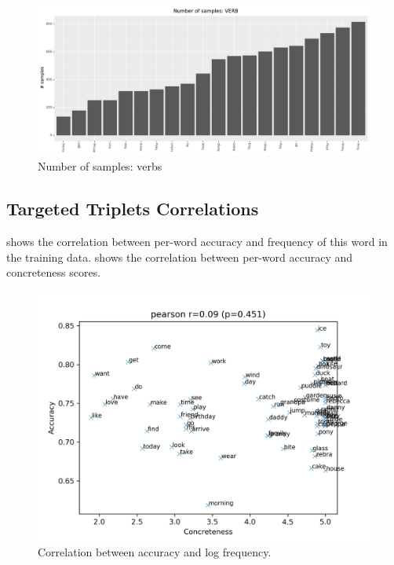 \begin{figure}
  \centering
  \includegraphics[width=\textwidth]{results/targeted_triplets/num_samples_per_word_VERB.pdf}
  \caption{Number of samples: verbs}
  \label{fig:num_samples_VERB_word}
\end{figure}

\subsection{Targeted Triplets Correlations}\label{app:targeted_triplets_correlations}

 shows the correlation between per-word accuracy and frequency of this word in the training data.
 shows the correlation between per-word accuracy and concreteness scores.


\begin{figure}
  \centering
  \includegraphics[width=\textwidth]{results/targeted_triplets/correlation_concreteness_acc_version_206980.png}
  \caption{Correlation between accuracy and log frequency.}
  \label{fig:results_correlation_frequency_acc}
\end{figure}

